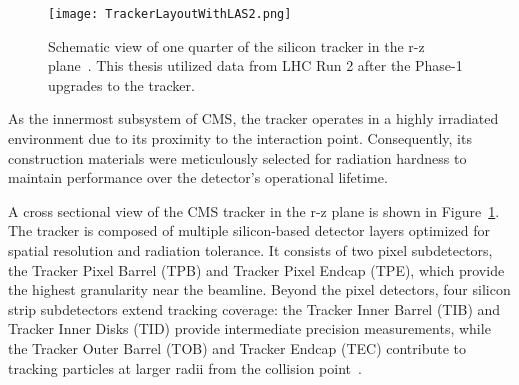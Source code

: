 \begin{figure}[!hbt]
    \begin{center}
        \texttt{[image: TrackerLayoutWithLAS2.png]}
        \caption{Schematic view of one quarter of the silicon tracker in the r-z plane~\cite{Adam:2748381}. This thesis utilized data from LHC Run 2 after the Phase-1 upgrades to the tracker.}
        \label{fig:silicontracker}
    \end{center}
\end{figure}

As the innermost subsystem of CMS, the tracker operates in a highly irradiated environment due to its proximity to the interaction point. Consequently, its construction materials were meticulously selected for radiation hardness to maintain performance over the detector’s operational lifetime.

A cross sectional view of the CMS tracker in the r-z plane is shown in Figure~\ref{fig:silicontracker}. The tracker is composed of multiple silicon-based detector layers optimized for spatial resolution and radiation tolerance. It consists of two pixel subdetectors, the Tracker Pixel Barrel (TPB) and Tracker Pixel Endcap (TPE), which provide the highest granularity near the beamline. Beyond the pixel detectors, four silicon strip subdetectors extend tracking coverage: the Tracker Inner Barrel (TIB) and Tracker Inner Disks (TID) provide intermediate precision measurements, while the Tracker Outer Barrel (TOB) and Tracker Endcap (TEC) contribute to tracking particles at larger radii from the collision point~\cite{Chatrchyan:1667597}. 



